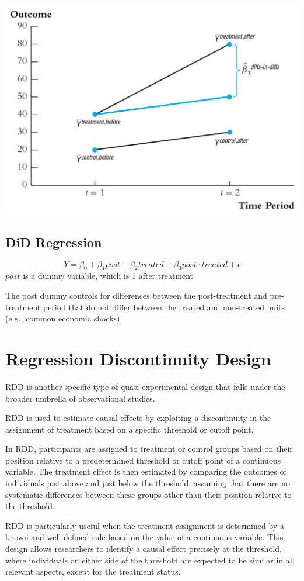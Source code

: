 \documentclass[a3paper, 8pt]{extarticle}
\begin{document}
\begin{multicols*}{5}
\includegraphics[width = \columnwidth]{Screen Shot 2023-05-25 at 14.18.58.png}

\subsection{DiD Regression}
$$Y=\beta_0 + \beta_1 post + \beta_2 treated + \beta_3 post \cdot treated + \epsilon$$
$post$ is a dummy variable, which is 1 after treatment

The post dummy controls for differences between the post-treatment
and pre-treatment period that do not differ between the treated and non-treated units (e.g., common economic shocks)
\section{Regression Discontinuity Design}
RDD is another specific type of quasi-experimental design that falls under the broader umbrella of observational studies. 

RDD is used to estimate causal effects by exploiting a discontinuity in the assignment of treatment based on a specific threshold or cutoff point.

In RDD, participants are assigned to treatment or control groups based on their position relative to a predetermined threshold or cutoff point of a continuous variable. The treatment effect is then estimated by comparing the outcomes of individuals just above and just below the threshold, assuming that there are no systematic differences between these groups other than their position relative to the threshold.

RDD is particularly useful when the treatment assignment is determined by a known and well-defined rule based on the value of a continuous variable. This design allows researchers to identify a causal effect precisely at the threshold, where individuals on either side of the threshold are expected to be similar in all relevant aspects, except for the treatment status.


\end{multicols*}
\end{document}
